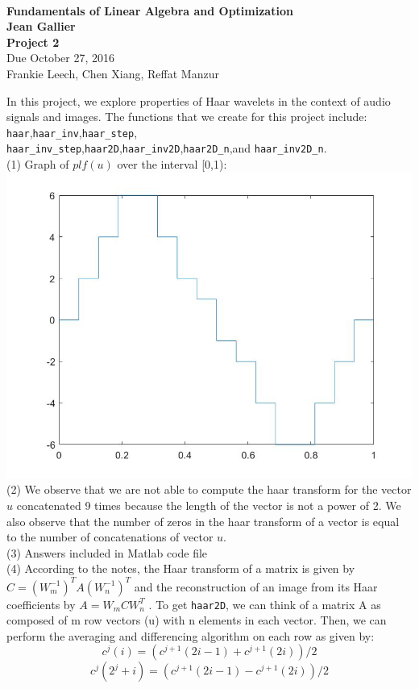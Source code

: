\documentclass[12pt]{article}
\begin{document}
\begin{center}
\\
\vspace{1cm}
{\Large\bf Fundamentals of Linear Algebra and Optimization\\
Jean Gallier \\
\vspace{0.5cm}
Project 2}\\[10pt]
Due October 27, 2016\\
Frankie Leech, Chen Xiang, Reffat Manzur\\
\end{center}

\vspace{0.5cm}

\medskip

In this project, we explore properties of Haar wavelets in the context of audio signals and images. The functions that we create for this project include: {\tt haar},{\tt haar\_inv},{\tt haar\_step},\\{\tt haar\_inv\_step},{\tt haar2D},{\tt haar\_inv2D},{\tt haar2D\_n},and {\tt haar\_inv2D\_n}.
\medskip\\
(1) Graph of $plf(u)$ over the interval [0,1):\\
\includegraphics[scale=.5]{plfgraph}
\medskip
\\(2) We observe that we are not able to compute the haar transform for the vector $u$ concatenated 9 times because the length of the vector is not a power of 2. We also observe that the number of zeros in the haar transform of a vector is equal to the number of concatenations of vector $u$.
\medskip\\
(3) Answers included in Matlab code file
\medskip\\
(4)
According to the notes, the Haar transform of a matrix is given by $C = (W_m^{-1})^T A (W_n^{-1})^T$ and the reconstruction of an image from its Haar coefficients by $A = W_m C W_n^T$ . To get {\tt haar2D}, we can think of a matrix A as    composed of m row vectors (u) with n elements in each vector. Then, we can perform the averaging and differencing algorithm on each row as given by:
$$c^j(i) = (c^{j+1}(2i -1) + c^{j+1}(2i))/2$$  
$$c^j(2^j+i) = (c^{j+1}(2i -1) - c^{j+1}(2i))/2$$ 
\end{document}
